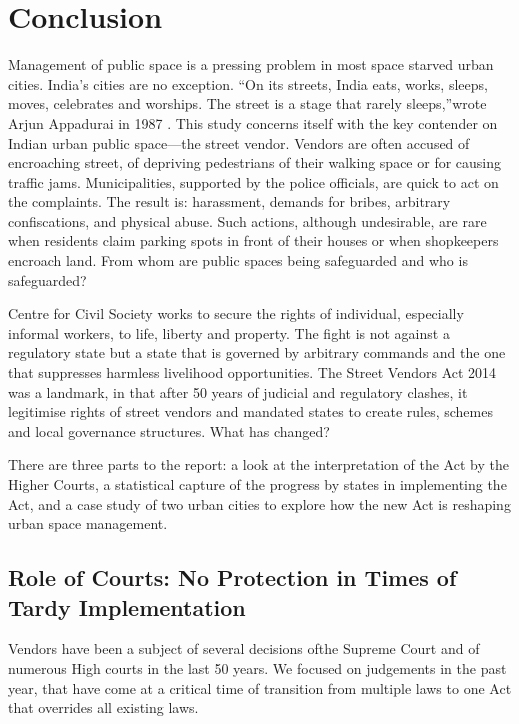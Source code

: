 \documentclass[a4paper, 12pt, twoside]{article}
\begin{document}
{{%
\section*{Conclusion}

Management of public space is a pressing problem in most space starved urban cities. India’s cities are no exception. “On its streets, India eats, works, sleeps, moves, celebrates and worships. The street is a stage that rarely sleeps,”wrote Arjun Appadurai in 1987 \parencite{naikpaper}. This study concerns itself with the key contender on Indian urban public space—the street vendor. Vendors are often accused of encroaching street, of depriving pedestrians of their walking space or for causing traffic jams. Municipalities, supported by the police officials, are quick to act on the complaints. The result is: harassment, demands for bribes, arbitrary confiscations, and physical abuse. Such actions, although undesirable, are rare when residents claim parking spots in front of their houses or when shopkeepers encroach land. From whom are public spaces being safeguarded and who is safeguarded?

Centre for Civil Society works to secure the rights of individual, especially informal workers, to life, liberty and property. The fight is not against a regulatory state but a state that is governed by arbitrary commands and the one that suppresses harmless livelihood opportunities. The Street Vendors Act 2014 was a landmark, in that after 50 years of judicial and regulatory clashes, it legitimise rights of street vendors and mandated states to create rules, schemes and local governance structures. What has changed?

There are three parts to the report: a look at the interpretation of the Act by the Higher Courts, a statistical capture of the progress by states in implementing the Act, and a case study of two urban cities to explore how the new Act is reshaping urban space management.

\subsection*{Role of Courts: No Protection in Times of Tardy Implementation}
Vendors have been a subject of several decisions ofthe Supreme Court and of numerous High courts in the last 50 years. We focused on judgements in the past year, that have come at a critical time of transition from multiple laws to one Act that overrides all existing laws.

}}
\end{document}
